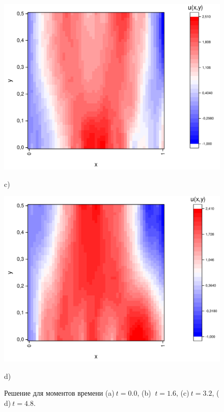 \documentclass[a4paper,12pt]{article}
\begin{document}
\begin{figure}[h!]
\begin{center}
\begin{minipage}[h]{0.23\linewidth}
		\end{minipage}
		\begin{minipage}[h]{0.23\linewidth}
			\includegraphics[width=\textwidth]{graphs/graphs_l/v1/wave_t-16_v1.pdf} \begin{center}	c)	\end{center}
		\end{minipage}
		\begin{minipage}[h]{0.23\linewidth}
			\includegraphics[width=\textwidth]{graphs/graphs_l/v1/wave_t-24_v1.pdf} \begin{center}	d)	\end{center}
		\end{minipage}
	\end{center}
	\caption{Решение для моментов времени (a)$\ t = 0.0$, (b) $\ t = 1.6$, (c)$\ t = 3.2$, (	d)$\ t = 4.8$.}
\end{figure}
\end{document}
